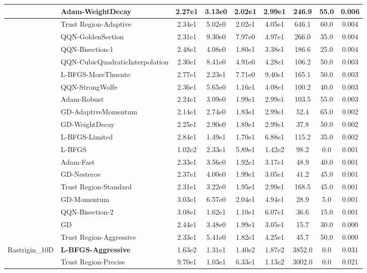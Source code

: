 \documentclass[10pt]{article}
\begin{document}
\begin{longtable}{|l|l|c|c|c|c|c|c|c|}
\hline
 & Adam-WeightDecay & 2.27e1 & 3.13e0 & 2.02e1 & 2.99e1 & 246.9 & 55.0 & 0.006 \\
\hline
 & Trust Region-Adaptive & 2.34e1 & 5.02e0 & 2.02e1 & 4.05e1 & 646.1 & 60.0 & 0.004 \\
\hline
 & QQN-GoldenSection & 2.31e1 & 9.30e0 & 7.97e0 & 4.97e1 & 266.0 & 35.0 & 0.004 \\
\hline
 & QQN-Bisection-1 & 2.48e1 & 4.08e0 & 1.80e1 & 3.38e1 & 186.6 & 25.0 & 0.004 \\
\hline
 & QQN-CubicQuadraticInterpolation & 2.30e1 & 8.41e0 & 4.91e0 & 4.28e1 & 106.2 & 50.0 & 0.003 \\
\hline
 & L-BFGS-MoreThuente & 2.77e1 & 2.23e1 & 7.71e0 & 9.40e1 & 165.1 & 50.0 & 0.003 \\
\hline
 & QQN-StrongWolfe & 2.36e1 & 5.65e0 & 1.16e1 & 4.08e1 & 100.2 & 40.0 & 0.003 \\
\hline
 & Adam-Robust & 2.24e1 & 3.09e0 & 1.99e1 & 2.99e1 & 103.5 & 55.0 & 0.003 \\
\hline
 & GD-AdaptiveMomentum & 2.14e1 & 2.74e0 & 1.83e1 & 2.99e1 & 52.4 & 65.0 & 0.002 \\
\hline
 & GD-WeightDecay & 2.25e1 & 2.90e0 & 1.89e1 & 2.99e1 & 37.8 & 50.0 & 0.002 \\
\hline
 & L-BFGS-Limited & 2.84e1 & 1.49e1 & 1.70e1 & 6.88e1 & 115.2 & 35.0 & 0.002 \\
\hline
 & L-BFGS & 1.02e2 & 2.33e1 & 5.89e1 & 1.42e2 & 98.2 & 0.0 & 0.001 \\
\hline
 & Adam-Fast & 2.33e1 & 3.56e0 & 1.92e1 & 3.17e1 & 48.9 & 40.0 & 0.001 \\
\hline
 & GD-Nesterov & 2.37e1 & 4.00e0 & 1.99e1 & 3.05e1 & 41.2 & 45.0 & 0.001 \\
\hline
 & Trust Region-Standard & 2.31e1 & 3.22e0 & 1.95e1 & 2.99e1 & 168.5 & 45.0 & 0.001 \\
\hline
 & GD-Momentum & 3.03e1 & 6.57e0 & 2.04e1 & 4.94e1 & 28.9 & 5.0 & 0.001 \\
\hline
 & QQN-Bisection-2 & 3.08e1 & 1.62e1 & 1.10e1 & 6.07e1 & 36.6 & 15.0 & 0.001 \\
\hline
 & GD & 2.44e1 & 3.48e0 & 1.99e1 & 3.05e1 & 15.7 & 30.0 & 0.000 \\
\hline
 & Trust Region-Aggressive & 2.33e1 & 5.41e0 & 1.82e1 & 4.25e1 & 45.7 & 50.0 & 0.000 \\
Rastrigin\_10D & \textbf{L-BFGS-Aggressive} & 1.63e2 & 1.31e1 & 1.40e2 & 1.87e2 & 3852.0 & 0.0 & 0.031 \\
\hline
 & Trust Region-Precise & 9.70e1 & 1.03e1 & 6.33e1 & 1.13e2 & 3002.0 & 0.0 & 0.021 \\

\end{longtable}
\end{document}
